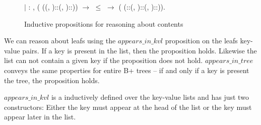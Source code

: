 \begin{figure}
\begin{coqdoccode}
  \coqdocindent{1.00em}
  \ensuremath{|} : \coqdockw{\ensuremath{\forall}}      ,\coqdoceol
  \coqdocindent{8.00em}
    (   ((, )::(, )::)) \ensuremath{\rightarrow} \coqdoceol
  \coqdocindent{8.00em}
   \ensuremath{\le}  \ensuremath{\rightarrow}\coqdoceol
  \coqdocindent{8.00em}
    (   (::(, )::(, )::)).\coqdoceol
  \end{coqdoccode}
\caption{Inductive propositions for reasoning about contents}
\label{fig:aik_and_ait}
\end{figure}

We can reason about leafs using the $appears\_in\_kvl$ proposition on the leafs key-value pairs. If a key is present in the list, then the proposition holds. Likewise the list can not contain a given key if the proposition does not hold. $appears\_in\_tree$ conveys the same properties for entire B+ trees -- if and only if a key is present the tree, the proposition holds.

$appears\_in\_kvl$ is a inductively defined over the key-value lists and has just two constructors: Either the key must appear at the head of the list or the key must appear later in the list.

